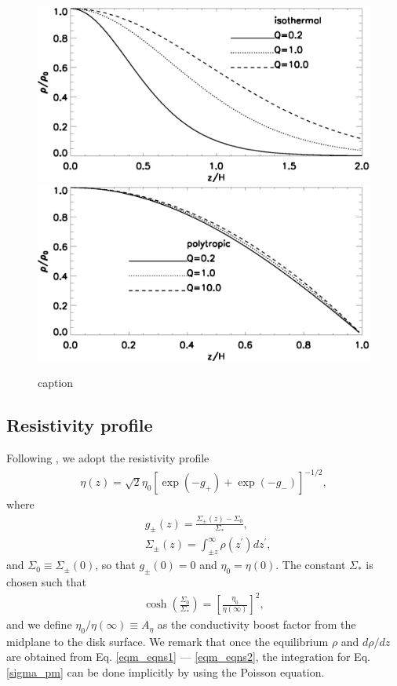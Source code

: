 \begin{figure}
  \includegraphics[width=\linewidth]{figures/compare_iso_density}
  \includegraphics[width=\linewidth]{figures/compare_poly_density}
  \caption{caption\label{eqm_den}}
\end{figure}

\subsection{Resistivity profile}
Following \cite{fleming03}, we adopt the resistivity profile
\begin{align}
  \eta(z) =
  \sqrt{2}\eta_0\left[\exp{\left(-g_+\right)}+\exp{\left(-g_-\right)}\right]^{-1/2},  
\end{align}
where
\begin{align}
  &g_\pm(z) =  \frac{\Sigma_\pm(z)-\Sigma_0}{\Sigma_*}, \\
  &\Sigma_\pm(z) = \int_{\pm z}^\infty\rho(z^\prime)dz^\prime, \label{sigma_pm}
\end{align}
and $\Sigma_0\equiv\Sigma_{\pm}(0)$, so that $g_\pm(0)=0$ and $\eta_0 
= \eta(0)$. The constant $\Sigma_*$ is chosen such that 
\begin{align}
  \cosh{\left(\frac{\Sigma_0}{\Sigma_*}\right)} =
  \left[\frac{\eta_0}{\eta(\infty)}\right]^2,
\end{align}
and we define $\eta_0/\eta(\infty)\equiv A_\eta$ as the conductivity
boost factor from the midplane to the disk surface. We remark that
once the equilibrium $\rho$ and $d\rho/dz$ are obtained from
Eq. \ref{eqm_eqns1} --- \ref{eqm_eqns2}, the integration for
Eq. \ref{sigma_pm} can be done implicitly by using the Poisson
equation. 

